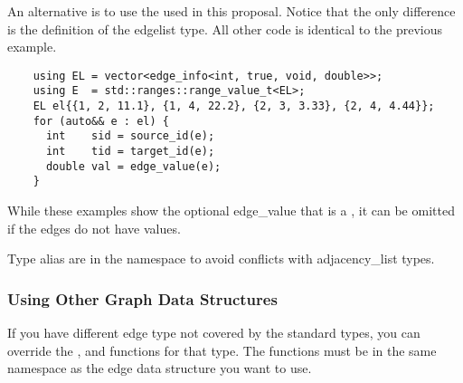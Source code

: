 An alternative is to use the  used in this proposal. Notice that the only difference
is the definition of the edgelist type. All other code is identical to the previous example.
\begin{lstlisting}
    using EL = vector<edge_info<int, true, void, double>>;
    using E  = std::ranges::range_value_t<EL>;
    EL el{{1, 2, 11.1}, {1, 4, 22.2}, {2, 3, 3.33}, {2, 4, 4.44}};
    for (auto&& e : el) {
      int    sid = source_id(e);
      int    tid = target_id(e);
      double val = edge_value(e);
    }
\end{lstlisting}

While these examples show the optional edge\_value that is a , it can be omitted if the edges 
do not have values.

Type alias are in the namespace  to avoid conflicts with adjacency\_list
types.

\subsubsection{Using Other Graph Data Structures}
If you have different edge type not covered by the standard types, you can override the
,  and  functions for that type.
The functions must be in the same namespace as the edge data structure you want to use.

